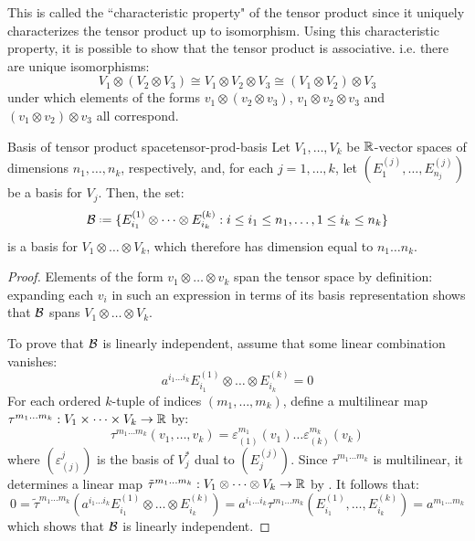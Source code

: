 This is called the ``characteristic property" of the tensor product since it uniquely characterizes the tensor product up to isomorphism. Using this characteristic property, it is possible to show that the tensor product is associative. i.e. there are unique isomorphisms:
\begin{equation*}
  V_1 \otimes (V_2 \otimes V_3) \cong V_1 \otimes V_2 \otimes V_3 \cong (V_1 \otimes V_2) \otimes V_3
\end{equation*}
under which elements of the forms $ v_1 \otimes (v_2 \otimes v_3) $, $ v_1 \otimes v_2 \otimes v_3 $ and $ (v_1 \otimes v_2) \otimes v_3 $ all correspond.

\begin{proposition}{Basis of tensor product space}{tensor-prod-basis}
  Let $ V_1 , \dots , V_k $ be $ \mathbb{R} $-vector spaces of dimensions $ n_1 , \dots , n_k $, respectively, and, for each $ j = 1 , \dots , k $, let $ (E_1^{(j)} , \dots , E_{n_j}^{(j)}) $ be a basis for $ V_j $. Then, the set:
  \begin{equation*}
    \bas \defeq \{ E_{i_1}^{(1)} \otimes \dots \otimes E_{i_k}^{(k)} : i \leq i_1 \leq n_1 , \dots , 1 \leq i_k \leq n_k \}
  \end{equation*}
  is a basis for $ V_1 \otimes \dots \otimes V_k $, which therefore has dimension equal to $ n_1 \dots n_k $.
\end{proposition}

\begin{proofbox}
  \begin{proof}
    Elements of the form $ v_1 \otimes \dots \otimes v_k $ span the tensor space by definition: expanding each $ v_i $ in such an expression in terms of its basis representation shows that $ \mathcal{B} $ spans $ V_1 \otimes \dots \otimes V_k $.

    To prove that $ \mathcal{B} $ is linearly independent, assume that some linear combination vanishes:
    \begin{equation*}
      a^{i_1 \dots i_k} E_{i_1}^{(1)} \otimes \dots \otimes E_{i_k}^{(k)} = 0
    \end{equation*}
    For each ordered $ k $-tuple of indices $ (m_1 , \dots , m_k) $, define a multilinear map $ \tau^{m_1 \dots m_k} : V_1 \times \dots \times V_k \rightarrow \mathbb{R} $ by:
    \begin{equation*}
      \tau^{m_1 \dots m_k}(v_1 , \dots , v_k) = \varepsilon_{(1)}^{m_1}(v_1) \dots \varepsilon_{(k)}^{m_k}(v_k)
    \end{equation*}
    where $ (\varepsilon_{(j)}^j) $ is the basis of $ V_j^* $ dual to $ (E_j^{(j)}) $. Since $ \tau^{m_1 \dots m_k} $ is multilinear, it determines a linear map $ \tilde{\tau}^{m_1 \dots m_k} : V_1 \otimes \dots \otimes V_k \rightarrow \mathbb{R} $ by . It follows that:
    \begin{equation*}
      0 = \tilde{\tau}^{m_1 \dots m_k}(a^{i_1 \dots i_k} E_{i_1}^{(1)} \otimes \dots \otimes E_{i_k}^{(k)}) = a^{i_1 \dots i_k} \tau^{m_1 \dots m_k}(E_{i_1}^{(1)} , \dots , E_{i_k}^{(k)}) = a^{m_1 \dots m_k}
    \end{equation*}
    which shows that $ \mathcal{B} $ is linearly independent.
  \end{proof}
\end{proofbox}

